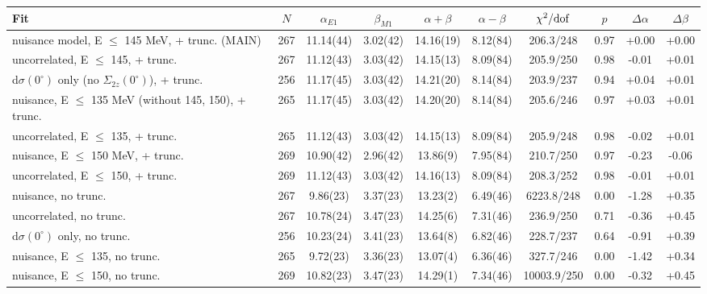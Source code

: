 \begin{tabular}{lccccccccc}
\hline
Fit & $N$ & $\alpha_{E1}$ & $\beta_{M1}$ & $\alpha+\beta$ & $\alpha-\beta$ & $\chi^2/{\rm dof}$ & $p$ & $\Delta\alpha$ & $\Delta\beta$ \\
\hline
nuisance model, E $\le$ 145 MeV, + trunc. (MAIN) & 267 & 11.14(44) & 3.02(42) & 14.16(19) & 8.12(84) & 206.3/248 & 0.97 & +0.00 & +0.00 \\
uncorrelated, E $\le$ 145, + trunc. & 267 & 11.12(43) & 3.03(42) & 14.15(13) & 8.09(84) & 205.9/250 & 0.98 & -0.01 & +0.01 \\
d$\sigma(0^\circ)$ only (no $\Sigma_{2z}(0^\circ)$), + trunc. & 256 & 11.17(45) & 3.03(42) & 14.21(20) & 8.14(84) & 203.9/237 & 0.94 & +0.04 & +0.01 \\
nuisance, E $\le$ 135 MeV (without 145, 150), + trunc. & 265 & 11.17(45) & 3.03(42) & 14.20(20) & 8.14(84) & 205.6/246 & 0.97 & +0.03 & +0.01 \\
uncorrelated, E $\le$ 135, + trunc. & 265 & 11.12(43) & 3.03(42) & 14.15(13) & 8.09(84) & 205.9/248 & 0.98 & -0.02 & +0.01 \\
nuisance, E $\le$ 150 MeV, + trunc. & 269 & 10.90(42) & 2.96(42) & 13.86(9) & 7.95(84) & 210.7/250 & 0.97 & -0.23 & -0.06 \\
uncorrelated, E $\le$ 150, + trunc. & 269 & 11.12(43) & 3.03(42) & 14.16(13) & 8.09(84) & 208.3/252 & 0.98 & -0.01 & +0.01 \\
nuisance, no trunc. & 267 & 9.86(23) & 3.37(23) & 13.23(2) & 6.49(46) & 6223.8/248 & 0.00 & -1.28 & +0.35 \\
uncorrelated, no trunc. & 267 & 10.78(24) & 3.47(23) & 14.25(6) & 7.31(46) & 236.9/250 & 0.71 & -0.36 & +0.45 \\
d$\sigma(0^\circ)$ only, no trunc. & 256 & 10.23(24) & 3.41(23) & 13.64(8) & 6.82(46) & 228.7/237 & 0.64 & -0.91 & +0.39 \\
nuisance, E $\le$ 135, no trunc. & 265 & 9.72(23) & 3.36(23) & 13.07(4) & 6.36(46) & 327.7/246 & 0.00 & -1.42 & +0.34 \\
nuisance, E $\le$ 150, no trunc. & 269 & 10.82(23) & 3.47(23) & 14.29(1) & 7.34(46) & 10003.9/250 & 0.00 & -0.32 & +0.45 \\
\hline
\end{tabular}

